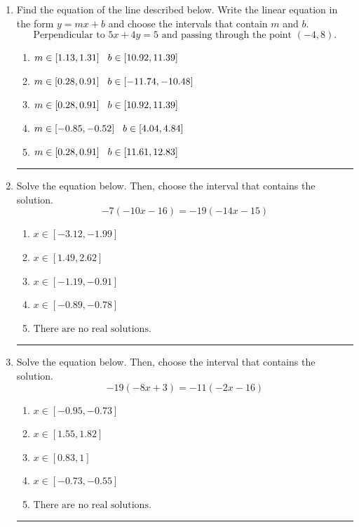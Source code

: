 \documentclass[14pt]{extbook}
\newcommand{\litem}[1]{\item#1\hspace*{-1cm}\rule{\textwidth}{0.4pt}}
\begin{document}
\begin{enumerate}
\litem{
Find the equation of the line described below. Write the linear equation in the form $ y=mx+b $ and choose the intervals that contain $m$ and $b$.\[ \text{Perpendicular to } 5 x + 4 y = 5 \text{ and passing through the point } (-4, 8). \]\begin{enumerate}[label=\Alph*.]
\item \( m \in [1.13, 1.31] \hspace*{3mm} b \in [10.92, 11.39] \)
\item \( m \in [0.28, 0.91] \hspace*{3mm} b \in [-11.74, -10.48] \)
\item \( m \in [0.28, 0.91] \hspace*{3mm} b \in [10.92, 11.39] \)
\item \( m \in [-0.85, -0.52] \hspace*{3mm} b \in [4.04, 4.84] \)
\item \( m \in [0.28, 0.91] \hspace*{3mm} b \in [11.61, 12.83] \)

\end{enumerate} }
\litem{
Solve the equation below. Then, choose the interval that contains the solution.\[ -7(-10x -16) = -19(-14x -15) \]\begin{enumerate}[label=\Alph*.]
\item \( x \in [-3.12, -1.99] \)
\item \( x \in [1.49, 2.62] \)
\item \( x \in [-1.19, -0.91] \)
\item \( x \in [-0.89, -0.78] \)
\item \( \text{There are no real solutions.} \)

\end{enumerate} }
\litem{
Solve the equation below. Then, choose the interval that contains the solution.\[ -19(-8x + 3) = -11(-2x -16) \]\begin{enumerate}[label=\Alph*.]
\item \( x \in [-0.95, -0.73] \)
\item \( x \in [1.55, 1.82] \)
\item \( x \in [0.83, 1] \)
\item \( x \in [-0.73, -0.55] \)
\item \( \text{There are no real solutions.} \)


\end{enumerate}}
\end{enumerate}
\end{document}
